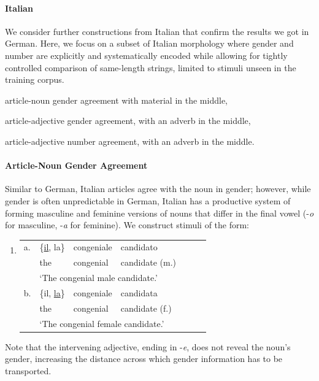 \paragraph{Italian} We consider further constructions from Italian that confirm the results we got in German.
Here, we focus on a  subset of Italian morphology where gender and number are explicitly and systematically
encoded while allowing for tightly controlled comparison of
same-length strings, limited to stimuli unseen in the training corpus.
\begin{inparaenum}[i)]
\item article-noun gender agreement with material in the middle,
\item article-adjective gender agreement, with an adverb in the middle,
\item article-adjective number agreement, with an adverb in the middle.
\end{inparaenum}

\paragraph{Article-Noun Gender Agreement}

Similar to German, Italian articles agree with the noun in gender; however, while gender is often unpredictable in German, Italian has a productive system of forming masculine and feminine versions of nouns that differ in the final vowel (-\emph{o} for masculine, -\emph{a} for feminine).
We construct stimuli of the form:
\begin{enumerate}[label={(\arabic*)}]
	\item 
		\begin{tabular}[t]{lllllll}
	a. & \{\underline{il}, la\} & congeniale & candidato \\
   &  the & congenial & candidate (m.) \\
	& \multicolumn{4}{l}{`The congenial male candidate.'} \\
	b. & \{il, \underline{la}\} & congeniale & candidata \\
    &the & congenial & candidate (f.) \\
	& \multicolumn{4}{l}{`The congenial female candidate.'} \\
\end{tabular}
\end{enumerate}

Note that the intervening adjective, ending in -\emph{e}, does not reveal the noun's gender, increasing the distance across which gender information has to be transported.

